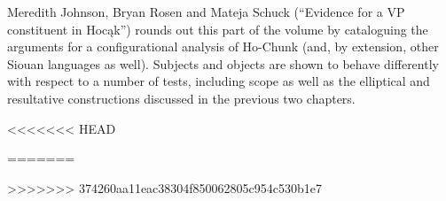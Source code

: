 \begin{refsection}
Meredith Johnson, Bryan Rosen and Mateja Schuck (``Evidence for a VP constituent in Hoc\k{a}k'') rounds out this part of the volume by cataloguing the arguments for a configurational analysis of Ho-Chunk (and, by extension, other Siouan languages as well). Subjects and objects are shown to behave differently with respect to a number of tests, including scope as well as the elliptical and resultative constructions discussed in the previous two chapters.

<<<<<<< HEAD
 
=======






>>>>>>> 374260aa11eac38304f850062805c954c530b1e7
\end{refsection}

